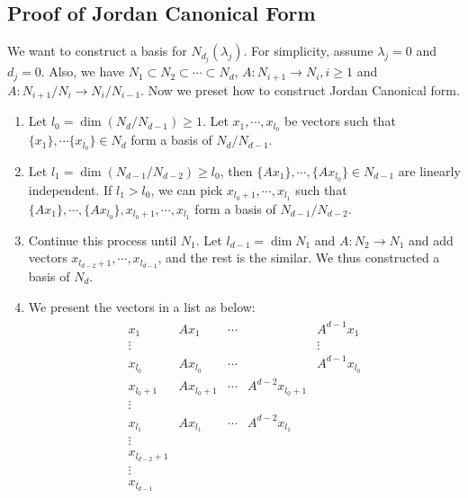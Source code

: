 \documentclass[11pt]{book}
\theoremstyle{definition}
\numberwithin{equation}{subsection}
\begin{document}
\subsection{Proof of Jordan Canonical Form}

We want to construct a basis for $N_{d_j}(\lambda_j)$. For simplicity, assume $\lambda_j = 0$ and $d_j = 0$. Also, we have $N_1\subset N_2 \subset \cdots \subset N_d$, $A:N_{i+1}\to N_{i}, i\geq 1$ and $A:N_{i+1}/N_{i}\to N_{i}/N_{i-1}$. Now we preset how to construct Jordan Canonical form.
\begin{enumerate}[label=Step \Roman*:]
    \item Let $l_0 = \dim (N_d/N_{d-1}) \geq 1$. Let $x_1,\cdots,x_{l_0}$ be vectors such that $\{x_1\}, \cdots \{x_{l_0}\} \in N_d$ form a basis of $N_d/N_{d-1}$.
    \item Let $l_1  = \dim (N_{d-1}/N_{d-2}) \geq l_0$, then $\{Ax_1\},\cdots, \{Ax_{l_0}\} \in N_{d-1}$ are linearly independent. If $l_1 > l_0$, we can pick $x_{l_0+1}, \cdots, x_{l_1}$ such that $\{Ax_1\},\cdots, \{Ax_{l_0}\}, x_{l_0+1}, \cdots, x_{l_1}$ form a basis of $N_{d-1}/N_{d-2}$.
    \item Continue this process until $N_1$. Let $l_{d-1} = \dim N_1$ and $A:N_2\to N_1$ and add vectors $x_{l_{d-2}+1},\cdots,x_{l_{d-1}}$, and the rest is the similar. We thus constructed a basis of $N_d$.
    \item We present the vectors in a list as below:
    \begin{align*}
        \begin{matrix}
            x_1 & Ax_1 & \cdots & & A^{d-1}x_1 \\
            \vdots &  &  & & \vdots \\
            x_{l_0} & Ax_{l_0} & \cdots & & A^{d-1}x_{l_0} \\
            x_{l_0+1} & Ax_{l_0+1} & \cdots & A^{d-2}x_{l_0+1} & \\
            \vdots &  &  &  & \\
            x_{l_1} & Ax_{l_1} & \cdots & A^{d-2}x_{l_1} & \\
            \vdots &  &  &  & \\
            x_{l_{d-2}+1} &  &  &  & \\
            \vdots &  &  &  & \\
            x_{l_{d-1}} &  &  &  & 
        \end{matrix}
    \end{align*}
\end{enumerate}
\end{document}
